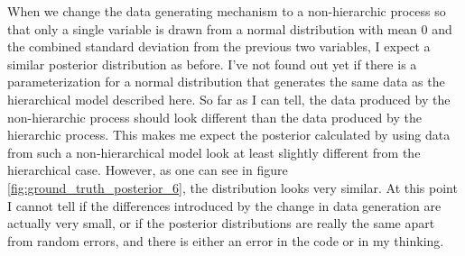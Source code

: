 \documentclass{article}
\begin{document}

When we change the data generating mechanism to a non-hierarchic process so that only a single variable is drawn from a normal distribution with mean 0 and the combined standard deviation from the previous two variables, I expect a similar posterior distribution as before. I've not found out yet if there is a parameterization for a normal distribution that generates the same data as the hierarchical model described here. So far as I can tell, the data produced by the non-hierarchic process should look different than the data produced by the hierarchic process. This makes me expect the posterior calculated by using data from such a non-hierarchical model look at least slightly different from the hierarchical case. However, as one can see in figure \ref{fig:ground_truth_posterior_6}, the distribution looks very similar. At this point I cannot tell if the differences introduced by the change in data generation are actually very small, or if the posterior distributions are really the same apart from random errors, and there is either an error in the code or in my thinking.
\end{document}
